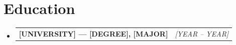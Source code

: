 \documentclass[letterpaper,10.5pt]{article}
\newcommand{\project}[2]{%
  \item[]\begin{tabularx}{\linewidth}{X r}
    \textbf{#1} & \small\emph{#2}\\
  \end{tabularx}\vspace{-6pt}}
\begin{document}
\section{Education}
\begin{itemize}
  \project{[UNIVERSITY] --- [DEGREE], [MAJOR]}{[YEAR -- YEAR]}
\end{itemize}
\end{document}
